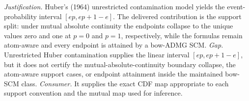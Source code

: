 \documentclass{article}
\begin{document}
\par\smallskip\noindent \textit{Justification.} Huber's (1964) unrestricted contamination model yields the event-probability interval \([ep,ep+1-e]\). The delivered contribution is the support split: under mutual absolute continuity the endpoints collapse to the unique values zero and one at \(p=0\) and \(p=1\), respectively, while the formulas remain atom-aware and every endpoint is attained by a bow-ADMG SCM. \textit{Gap.} Unrestricted Huber contamination supplies the linear interval \([ep,ep+1-e]\), but it does not certify the mutual-absolute-continuity boundary collapse, the atom-aware support cases, or endpoint attainment inside the maintained bow-SCM class. \textit{Consumer.} It supplies the exact CDF map appropriate to each support convention and the mutual map used for inference.
\end{document}
